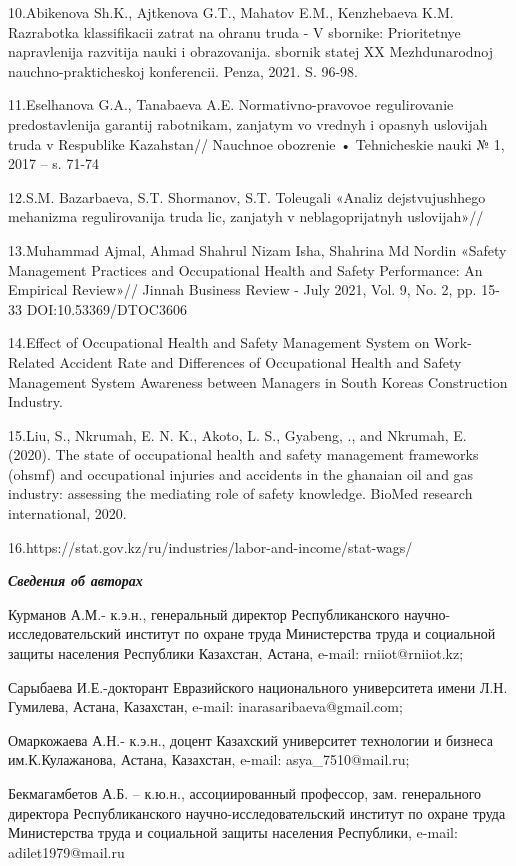 \begin{noparindent}
10.Abikenova Sh.K., Ajtkenova G.T., Mahatov E.M., Kenzhebaeva K.M.
Razrabotka klassifikacii zatrat na ohranu truda - V sbornike:
Prioritetnye napravlenija razvitija nauki i obrazovanija. sbornik statej
XX Mezhdunarodnoj nauchno-prakticheskoj konferencii. Penza, 2021. S.
96-98.

11.Eselhanova G.A., Tanabaeva A.E. Normativno-pravovoe regulirovanie
predostavlenija garantij rabotnikam, zanjatym vo vrednyh i opasnyh
uslovijah truda v Respublike Kazahstan// Nauchnoe obozrenie •
Tehnicheskie nauki № 1, 2017 -- s. 71-74

12.S.M. Bazarbaeva, S.T. Shormanov, S.T. Toleugali «Analiz
dejstvujushhego mehanizma regulirovanija truda lic, zanjatyh v
neblagoprijatnyh uslovijah»//

13.Muhammad Ajmal, Ahmad Shahrul Nizam Isha, Shahrina Md Nordin «Safety
Management Practices and Occupational Health and Safety Performance: An
Empirical Review»// Jinnah Business Review - July 2021, Vol. 9, No. 2,
pp. 15-33 DOI:10.53369/DTOC3606

14.Effect of Occupational Health and Safety Management System on
Work-Related Accident Rate and Differences of Occupational Health and
Safety Management System Awareness between Managers in South
Korea\textquotesingle s Construction Industry.

15.Liu, S., Nkrumah, E. N. K., Akoto, L. S., Gyabeng, ., and Nkrumah, E.
(2020). The state of occupational health and safety management
frameworks (ohsmf) and occupational injuries and accidents in the
ghanaian oil and gas industry: assessing the mediating role of safety
knowledge. BioMed research international, 2020.

16.https://stat.gov.kz/ru/industries/labor-and-income/stat-wags/
\end{noparindent}

\emph{{\bfseries Сведения об авторах}}

\begin{noparindent}
Курманов А.М.- к.э.н., генеральный директор Республиканского
научно-исследовательский институт по охране труда Министерства труда и
социальной защиты населения Республики Казахстан, Астана, e-mail:
rniiot@rniiot.kz;

Сарыбаева И.Е.-докторант Евразийского национального университета имени
Л.Н. Гумилева, Астана, Казахстан, e-mail: inarasaribaeva@gmail.com;

Омаркожаева А.Н.- к.э.н., доцент Казахский университет технологии и
бизнеса им.К.Кулажанова, Астана, Казахстан, e-mail: asya\_7510@mail.ru;

Бекмагамбетов А.Б. -- к.ю.н., ассоциированный профессор, зам.
генерального директора Республиканского научно-исследовательский
институт по охране труда Министерства труда и социальной защиты
населения Республики, e-mail: adilet1979@mail.ru
\end{noparindent}

